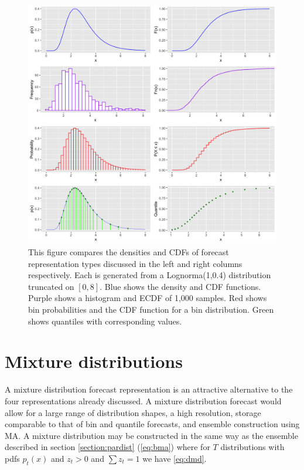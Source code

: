 \documentclass[11pt,notitlepage]{isuthesis}
\begin{document}
\begin{figure}[htbp]
\begin{center}

\captionsetup{font=scriptsize}
\centerline{\includegraphics[scale=.1]{Images/dens_cum_comp.png}}
\begin{minipage}{10cm}
\caption[Density/CDF comparison between parametric distribution, sample 
distribution, discretized bin distribution and quantiles]{This figure compares 
the
densities and CDFs of forecast representation types discussed in the left and 
right columns respectively. Each is generated from a Lognorma(1,0.4) 
distribution truncated on $[0,8]$. 
Blue shows the density and CDF functions. Purple shows a 
histogram and ECDF of 1,000 samples. Red shows bin probabilities and the CDF
function for a bin distribution. Green shows quantiles
with corresponding values.}
\label{fig:denscomp}
\end{minipage}
\end{center}
\end{figure}


\newpage

\section{Mixture distributions}
A mixture distribution forecast representation is an
attractive alternative to the four representations already discussed. 
A mixture distribution forecast
would allow for a large range of distribution shapes, a high resolution, 
storage comparable
to that of bin and quantile forecasts, and ensemble construction using MA.
A mixture distribution may be constructed in the same way as the
ensemble described in section \ref{section:pardist} 
(\ref{eq:bma}) 
where for $T$ distributions
with pdfs $p_t(x)$ and $z_t > 0$ and $\sum z_t = 1$ we have 
\eqref{eq:dmd}.
 
\end{document}
